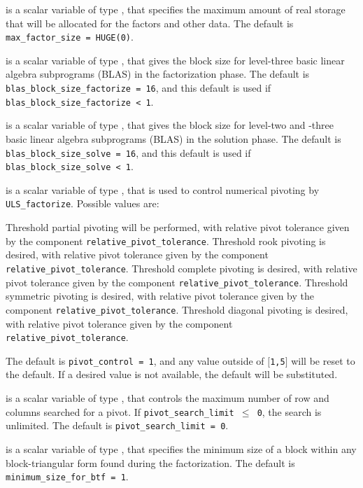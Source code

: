 \documentclass{galahad}
\newcommand{\packagename}{ULS}
\begin{document}
\begin{description}
 is a scalar variable of type \longinteger,
that specifies the maximum amount of real storage that will be
allocated for the factors and other data.
The default is {\tt max\_factor\_size = HUGE(0)}.

 is a scalar variable of type \integer,
that gives the block size for level-three basic linear algebra subprograms
(BLAS) in the factorization phase.
The default is {\tt blas\_block\_size\_factorize = 16},
and this default is used if {\tt blas\_block\_size\_factorize < 1}.

 is a scalar variable of type \integer,
that gives the block size for level-two and -three basic linear algebra
subprograms (BLAS) in the solution phase.
The default is {\tt blas\_block\_size\_solve = 16},
and this default is used if {\tt blas\_block\_size\_solve < 1}.

 is a scalar variable of type \integer,
that is used to control numerical pivoting by {\tt \packagename\_\-factorize}.
Possible values are:
\begin{description}
   Threshold partial pivoting will be performed, with relative pivot
     tolerance given by the component {\tt relative\_\-pivot\_tolerance}.
   Threshold rook pivoting is desired, with relative pivot
     tolerance given by the component {\tt relative\_\-pivot\_\-tolerance}.
   Threshold complete pivoting is desired, with relative pivot
     tolerance given by the component {\tt relative\_\-pivot\_tolerance}.
   Threshold symmetric pivoting is desired, with relative pivot
     tolerance given by the component {\tt relative\_\-pivot\_tolerance}.
   Threshold diagonal pivoting is desired, with relative pivot
     tolerance given by the component {\tt relative\_\-pivot\_tolerance}.
\end{description}
The default is {\tt pivot\_control = 1}, and any value outside of
$[${\tt1,5}$]$ will be reset to the default. If a desired value
is not available, the default will be substituted.

 is a scalar variable of type \integer,
that controls the maximum number of row and columns searched for a pivot.
If {\tt pivot\_search\_\-limit $\leq$ 0}, the search is unlimited.
The default is {\tt pivot\_search\_\-limit = 0}.

 is a scalar variable of type \integer,
that specifies the minimum size of a block within any block-triangular
form found during the factorization.
The default is {\tt minimum\_size\_for\_btf = 1}.


\end{description}
\end{document}
